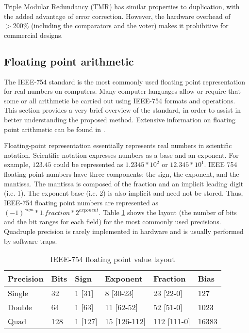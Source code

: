 \documentclass[12pt]{yalephd}
\begin{document}
Triple Modular Redundancy (TMR) \cite{gallagher2000fault} has similar properties to duplication, with the added advantage of error correction. However, the hardware overhead of $>200\%$ (including the comparators and the voter) makes it prohibitive for commercial designs.

\subsection{Floating point arithmetic}\label{sC3sIEEE754}

The IEEE-754 standard is the most commonly used floating point representation for real numbers on computers. Many computer languages allow or require that some or all arithmetic be carried out using IEEE-754 formats and operations. This section provides a very brief overview of the standard, in order to assist in better understanding the proposed method. Extensive information on floating point arithmetic can be found in \cite{Go91, stallings2009computer}.

Floating-point representation essentially represents real numbers in scientific notation. Scientific notation expresses numbers as a base and an exponent. For example, $123.45$ could be represented as $1.2345 * 10^2$ or $12.345 * 10^1$. IEEE 754 floating point numbers have three components: the sign, the exponent, and the mantissa. The mantissa is composed of the fraction and an implicit leading digit (i.e. 1). The exponent base (i.e. 2) is also implicit and need not be stored. Thus, IEEE-754 floating point numbers are represented as $(-1)^{sign} * 1.{fraction} * 2^{exponent}$. Table \ref{sC3tIEEEprecision} shows the layout (the number of bits and the bit ranges for each field) for the most commonly used precisions. Quadruple precision is rarely implemented in hardware and is usually performed by software traps.

\begin{table}[!ht]
\caption{IEEE-754 floating point value layout}\label{sC3tIEEEprecision}
\begin{center}
\begin{tabular}{||l|l|l|l|l|l||}
\hline
\hline
{\bf Precision} & {\bf Bits} & {\bf Sign} & {\bf Exponent} & {\bf Fraction} & {\bf Bias}\\
\hline
\hline
Single & 32 & 1 [31]  &  8 [30-23] & 23 [22-0] & 127  \\
\hline
Double & 64 & 1 [63]  & 11 [62-52] & 52 [51-0] & 1023 \\
\hline
Quad   &128 & 1 [127] & 15 [126-112] & 112 [111-0] & 16383  \\
\hline
\hline
\end{tabular}
\end{center}
\end{table}
\end{document}

